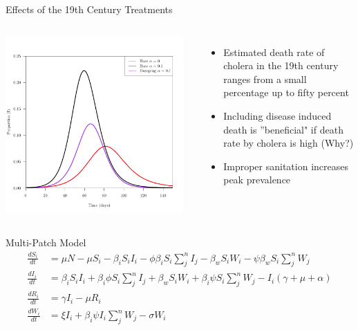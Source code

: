 \documentclass{beamer}\usepackage[]{graphicx}\usepackage[]{color}
\begin{document}
\begin{frame}{Effects of the 19th Century Treatments}
\begin{columns}[onlytextwidth]
\includegraphics[width=0.95\textwidth]{images/centurytreatment.pdf}
\begin{itemize}
\setlength\itemsep{2em}
\item Estimated death rate of cholera in the 19th century ranges from a small percentage up to fifty percent
\item Including disease induced death is ''beneficial" if death rate by cholera is high (Why?)
\item Improper sanitation increases peak prevalence
\end{itemize}
\end{columns}
\end{frame}

\begin{frame}[t]{Multi-Patch Model}
\begin{align*}
    \frac{dS_i}{dt}&= \mu N - \mu S_i - \beta_i S_i I_i - \phi \beta_i S_i \sum_j^n I_j - \beta_w S_i W_i - \psi \beta_w S_i \sum_j^n W_j\\[1em]
    \frac{dI_i}{dt}&= \beta_i S_i I_i + \beta_i \phi S_i \sum_j^n I_j + \beta_w S_i W_i + \beta_i \psi S_i \sum_j^n W_j - I_i (\gamma + \mu + \alpha) \\[1em]
    \frac{dR_i}{dt}&= \gamma I_i - \mu R_i \\[1em]
    \frac{dW_i}{dt}&= \xi I_i + \beta_i \psi I_i \sum_j^n W_j  - \sigma W_i
\end{align*}
\end{frame}
\end{document}
